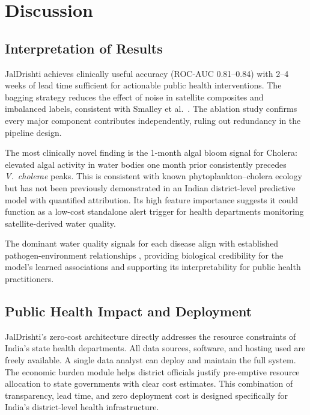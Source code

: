\documentclass[conference]{IEEEtran}
\begin{document}
\section{Discussion}

\subsection{Interpretation of Results}

JalDrishti achieves clinically useful accuracy (ROC-AUC 0.81--0.84)
with 2--4 weeks of lead time sufficient for actionable public health
interventions. The bagging strategy reduces the effect of noise in
satellite composites and imbalanced labels, consistent with Smalley
et al.\ \cite{smalley2025}. The ablation study confirms every major
component contributes independently, ruling out redundancy in the
pipeline design.

The most clinically novel finding is the 1-month algal bloom signal for
Cholera: elevated algal activity in water bodies one month prior
consistently precedes \textit{V.~cholerae} peaks. This is consistent
with known phytoplankton--cholera ecology \cite{oliva2022} but has not
been previously demonstrated in an Indian district-level predictive model
with quantified attribution. Its high feature importance suggests it
could function as a low-cost standalone alert trigger for health
departments monitoring satellite-derived water quality.

The dominant water quality signals for each disease align with
established pathogen-environment relationships
\cite{oliva2022,wang2024,campbell2020}, providing biological credibility
for the model's learned associations and supporting its interpretability
for public health practitioners.

\subsection{Public Health Impact and Deployment}

JalDrishti's zero-cost architecture directly addresses the resource
constraints of India's state health departments. All data sources,
software, and hosting used are freely available. A single data analyst
can deploy and maintain the full system. The economic burden module
helps district officials justify pre-emptive resource allocation to
state governments with clear cost estimates. This combination of
transparency, lead time, and zero deployment cost is designed
specifically for India's district-level health infrastructure.
\end{document}
